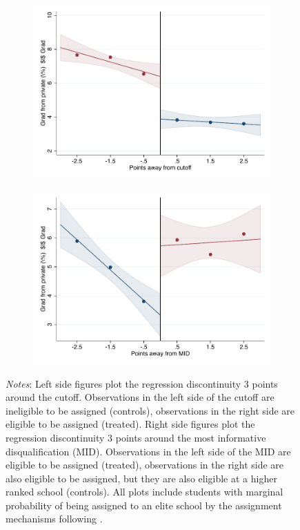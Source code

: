 \documentclass[oneside,11pt]{article}
\begin{document}
\begin{figure}[H]
\begin{center}
    \begin{subfigure}{0.475\textwidth}
        \centering
        \includegraphics[width=\textwidth]{04_Figures/rd_plot_tau_ENLACE_Privado_IPN3.pdf}
    \end{subfigure}
    \begin{subfigure}{0.475\textwidth}
        \centering
        \includegraphics[width=\textwidth]{04_Figures/rd_plot_mid_ENLACE_Privado_IPN3.pdf}
    \end{subfigure}
    \end{center}
    
\footnotesize
\textit{Notes}: Left side figures plot the regression discontinuity 3 points around the cutoff. Observations in the left side of the cutoff are ineligible to be assigned (controls), observations in the right side are eligible to be assigned (treated). Right side figures plot the regression discontinuity 3 points around the most informative disqualification (MID). Observations in the left side of the MID are eligible to be assigned (treated), observations in the right side are also eligible to be assigned, but they are also eligible at a higher ranked school (controls). All plots include students with marginal probability of being assigned to an elite school by the assignment mechanisms following \citet{abdulkadirouglu2022breaking}. 
\end{figure}
\end{document}
